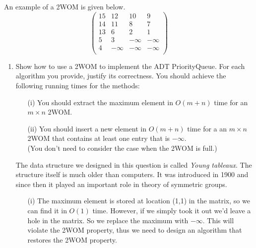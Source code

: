 \begin{codeExample}
  An example of a 2WOM is given below.
$$\left( \begin{array}{cccc}
    15 & 12 & 10 & 9 \\
    14 & 11 & 8 & 7 \\
    13 & 6 & 2 & 1 \\
    5 & 3 & -\infty & -\infty \\
    4 & -\infty & -\infty & -\infty \\
  \end{array}
\right) $$
\end{codeExample}
\begin{enumerate}
\item
Show how to use a 2WOM to implement the ADT PriorityQueue. For each
algorithm you provide, justify its correctness. You should achieve the
following running times for the methods:
\begin{itemize}
\item[(i)] You should extract the maximum element in $O(m+n)$ time for
    an $m\times n$ 2WOM. 
\item[(ii)] You should insert a new element in $O(m+n)$ time for a
    an $m\times n$ 2WOM that contains at least
    one entry that is $-\infty$. \\ 
    (You don't need to consider the case when the 2WOM is full.)
\end{itemize}



\begin{solution}
The data structure we designed in this question is called
\emph{Young tableaux}. The structure itself is much older
than computers. It was introduced in 1900 and since
then it played an important role in theory of symmetric
groups.

\begin{itemize}
\item[(i)] 
    The maximum element is stored at location (1,1) in the matrix,
    so we can find it in $O(1)$ time.  However, if we simply took it out
    we'd leave a hole in the matrix.
    So we replace the maximum
    with $-\infty$. This will violate the 2WOM property, thus we need
    to design an algorithm that restores the 2WOM property. 


\end{itemize}
\end{solution}
\end{enumerate}
